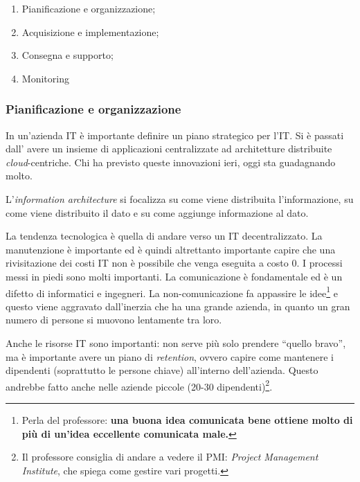 \begin{enumerate}
  \item Pianificazione e organizzazione;
  \item Acquisizione e implementazione;
  \item Consegna e supporto;
  \item Monitoring
\end{enumerate}

\subsubsection{Pianificazione e organizzazione}

In un'azienda IT è importante definire un piano strategico per l'IT. Si è passati dall'
avere un insieme di applicazioni centralizzate ad architetture distribuite 
\textit{cloud}-centriche. Chi ha previsto queste innovazioni ieri, oggi sta 
guadagnando molto.

L'\textit{information architecture} si focalizza su come viene distribuita 
l'informazione, su come viene distribuito il dato e su come aggiunge 
informazione al dato.

La tendenza tecnologica è quella di andare verso un IT decentralizzato. La 
manutenzione è importante ed è quindi altrettanto importante capire che una rivisitazione 
dei costi IT non è possibile che venga eseguita a costo 0. I processi messi in piedi sono 
molti importanti. La comunicazione è fondamentale ed è un difetto di 
informatici e ingegneri. La non-comunicazione fa appassire le 
idee\footnote{Perla del professore: \textbf{una buona idea comunicata bene 
ottiene molto di più di un'idea eccellente comunicata male.}} e questo viene 
aggravato dall'inerzia che ha una grande azienda, in quanto un gran numero di 
persone si muovono lentamente tra loro.

Anche le risorse IT sono importanti: non serve più solo prendere ``quello 
bravo'', ma è importante avere un piano di \textit{retention}, ovvero capire 
come mantenere i dipendenti (soprattutto le persone chiave) all'interno 
dell'azienda. Questo andrebbe fatto anche nelle aziende piccole (20-30 
dipendenti)\footnote{Il professore consiglia di andare a vedere il PMI: 
\textit{Project Management Institute}, che spiega come gestire vari progetti.}.

